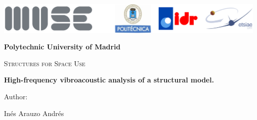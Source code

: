 \documentclass{article}
\numberwithin{equation}{section}
\numberwithin{equation}{subsection}
\begin{document}
\begin{center}
\thispagestyle{empty}

\includegraphics[width=16.5cm]{Logo_portada.png} \\

\vspace{2.5cm}

{\huge \textbf{Polytechnic University of Madrid}}\\
\vspace{1cm} 
{\scshape\Large Structures for Space Use \par}
\begin{center}
\vspace{3.5 cm}
{\bfseries\Huge High-frequency vibroacoustic analysis of a structural model. \par}
\vspace{7 cm}

\vfill
{\Large Author:  \par}
{\Large Inés Arauzo Andrés \par}

\end{center}
\end{center}

\thispagestyle{empty}

\newpage
{} %


\tableofcontents

\newpage
\listoffigures



\setlength{\parskip}{4mm}
\setlength{\parindent}{20pt}
\setlength{\headheight}{16.07225pt}

\newpage
{}




\newpage

\newpage

\newpage


% 
% 



\newpage
\clearpage

\printbibliography[title = {Bibliografía}]

\newpage
\clearpage

% 
\end{document}
